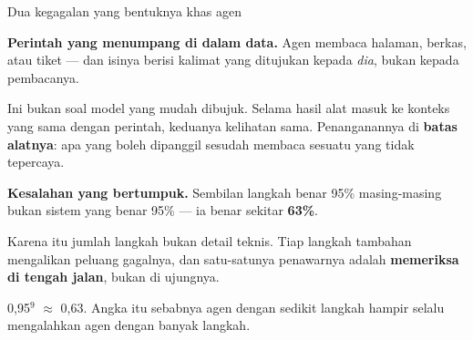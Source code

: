 \documentclass[aspectratio=169,11pt,t]{beamer}
\begin{document}
\begin{frame}[shrink=25]{Dua kegagalan yang bentuknya khas agen}
\begin{minipage}[t]{0.485\textwidth}
{\fontsize{9.4}{12.6}\selectfont\color{fg2}\textbf{Perintah yang menumpang di dalam data.} Agen membaca halaman, berkas, atau tiket --- dan isinya berisi kalimat yang ditujukan kepada \textit{dia}, bukan kepada pembacanya.\par}\vskip 4pt
{\fontsize{9.4}{12.6}\selectfont\color{fg2}Ini bukan soal model yang mudah dibujuk. Selama hasil alat masuk ke konteks yang sama dengan perintah, keduanya kelihatan sama. Penanganannya di \textbf{batas alatnya}: apa yang boleh dipanggil sesudah membaca sesuatu yang tidak tepercaya.\par}\vskip 4pt

\end{minipage}%
\hfill
\begin{minipage}[t]{0.485\textwidth}
{\fontsize{9.4}{12.6}\selectfont\color{fg2}\textbf{Kesalahan yang bertumpuk.} Sembilan langkah benar 95\% masing-masing bukan sistem yang benar 95\% --- ia benar sekitar \textbf{63\%}.\par}\vskip 4pt
{\fontsize{9.4}{12.6}\selectfont\color{fg2}Karena itu jumlah langkah bukan detail teknis. Tiap langkah tambahan mengalikan peluang gagalnya, dan satu-satunya penawarnya adalah \textbf{memeriksa di tengah jalan}, bukan di ujungnya.\par}\vskip 4pt

\end{minipage}%
\begin{iband}[signal]
0,95$^{9}$ $\approx$ 0,63. Angka itu sebabnya agen dengan sedikit langkah hampir selalu mengalahkan agen dengan banyak langkah.
\end{iband}
\end{frame}

\end{document}

